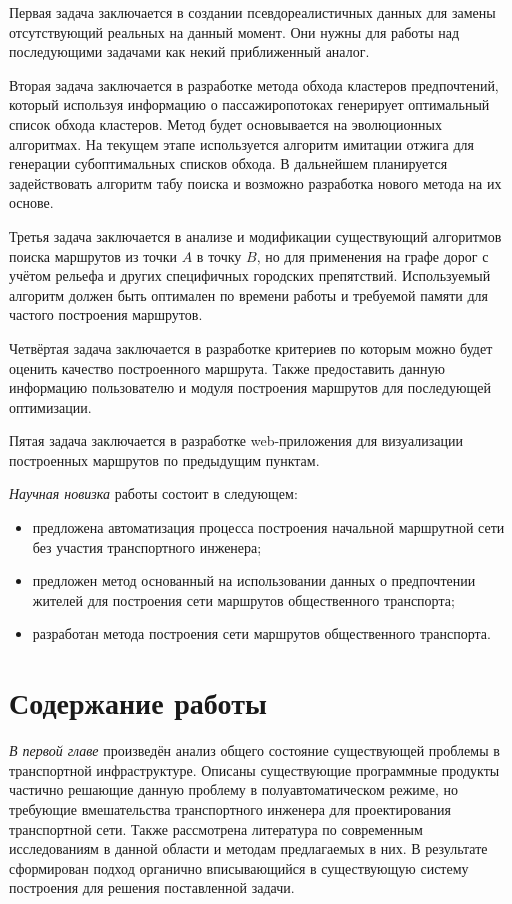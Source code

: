 Первая задача заключается в создании псевдореалистичных данных для замены отсутствующий реальных на данный 
момент. Они нужны для работы над последующими задачами как некий приближенный аналог.

Вторая задача заключается в разработке метода обхода кластеров предпочтений, который используя информацию о 
пассажиропотоках генерирует оптимальный список обхода кластеров. Метод будет основывается на эволюционных 
алгоритмах. На текущем этапе используется алгоритм имитации отжига для генерации субоптимальных списков 
обхода. В дальнейшем планируется задействовать алгоритм табу поиска и возможно разработка нового метода на 
их основе.

Третья задача заключается в анализе и модификации существующий алгоритмов поиска маршрутов из точки \( A \) 
в точку \( B \), но для применения на графе дорог с учётом рельефа и других специфичных городских 
препятствий. Используемый алгоритм должен быть оптимален по времени работы и требуемой памяти для частого 
построения маршрутов.

Четвёртая задача заключается в разработке критериев по которым можно будет оценить качество построенного 
маршрута. Также предоставить данную информацию пользователю и модуля построения маршрутов для последующей 
оптимизации.

Пятая задача заключается в разработке web-приложения для визуализации построенных маршрутов по предыдущим 
пунктам.

\emph{Научная новизка} работы состоит в следующем:
\begin{itemize}
    \item предложена автоматизация процесса построения начальной маршрутной сети без участия транспортного 
        инженера;
    \item предложен метод основанный на использовании данных о предпочтении жителей для построения сети 
        маршрутов общественного транспорта;
    \item разработан метода построения сети маршрутов общественного транспорта.
\end{itemize}

\section{Содержание работы}
\emph{В первой главе} произведён анализ общего состояние существующей проблемы в транспортной инфраструктуре. 
Описаны существующие программные продукты частично решающие данную проблему в полуавтоматическом режиме, но 
требующие вмешательства транспортного инженера для проектирования транспортной сети. Также рассмотрена 
литература по современным исследованиям в данной области и методам предлагаемых в них. В результате 
сформирован подход органично вписывающийся в существующую систему построения для решения поставленной задачи.

